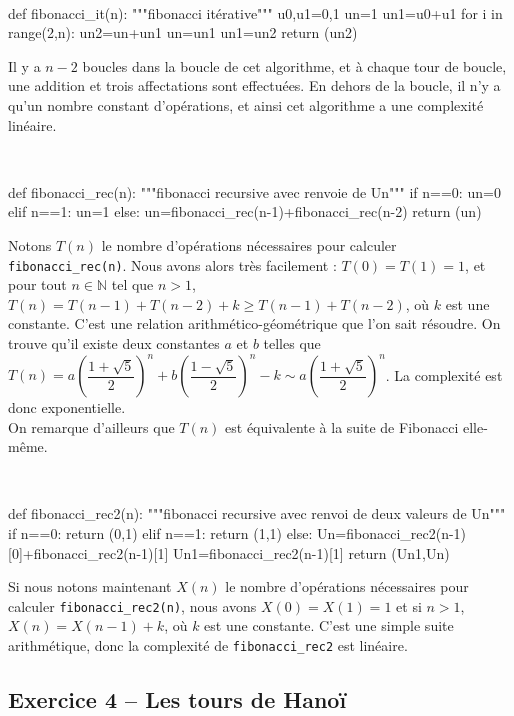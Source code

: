 \ifprof
\begin{corrige}
\question\
\begin{python}
def fibonacci_it(n):
    """fibonacci itérative"""
    u0,u1=0,1
    un=1
    un1=u0+u1
    for i in range(2,n):
        un2=un+un1
        un=un1
        un1=un2
    return (un2)
\end{python}
Il y a $n-2$ boucles dans la boucle de cet algorithme, et à chaque tour de boucle, une addition et trois affectations 
sont effectuées. En dehors de la boucle, il n'y a qu'un nombre constant d'opérations, et ainsi cet algorithme a une 
complexité linéaire.

\question\
\begin{python}
def fibonacci_rec(n):
    """fibonacci recursive avec renvoie de Un"""
    if n==0:
        un=0
    elif n==1:
        un=1
    else:
        un=fibonacci_rec(n-1)+fibonacci_rec(n-2)
    return (un)
\end{python}
Notons $T(n)$ le nombre d'opérations nécessaires pour calculer \texttt{fibonacci\_rec(n)}. Nous avons alors très 
facilement : $T(0)=T(1)=1$, et pour tout $n\in\mathbb N$ tel que $n>1$, $T(n)=T(n-1)+T(n-2)+k\geq T(n-1)+T(n-2)$, où 
$k$ est une constante. C'est une relation arithmético-géométrique que l'on sait résoudre. On trouve qu'il existe deux 
constantes $a$ et $b$ telles que $T(n)=a\left(\dfrac{1+\sqrt 5}2\right)^n+b\left(\dfrac{1-\sqrt 5}2\right)^n-k\sim 
a\left(\dfrac{1+\sqrt 5}2\right)^n$. La complexité est donc exponentielle.\\
On remarque d'ailleurs que $T(n)$ est équivalente à la suite de Fibonacci elle-même.

\question\
\begin{python}
def fibonacci_rec2(n):
    """fibonacci recursive avec renvoi de deux valeurs de Un"""
    if n==0:
        return (0,1)
    elif n==1:
        return (1,1)
    else:
        Un=fibonacci_rec2(n-1)[0]+fibonacci_rec2(n-1)[1]
        Un1=fibonacci_rec2(n-1)[1]
    return (Un1,Un)
\end{python}

Si nous notons maintenant $X(n)$ le nombre d'opérations nécessaires pour calculer \texttt{fibonacci\_rec2(n)}, nous 
avons $X(0)=X(1)=1$ et si $n>1$, $X(n)=X(n-1)+k$, où $k$ est une constante. C'est une simple suite arithmétique, donc 
la complexité de \texttt{fibonacci\_rec2} est linéaire.

\end{corrige}
\else
\fi

\subsection*{Exercice 4 -- Les tours de Hanoï}

